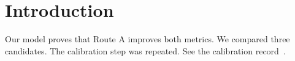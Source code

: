 \documentclass{article}
\begin{document}
\section{Introduction}
Our model proves that Route A improves both metrics.
We compared three candidates.
The calibration step was repeated.
See the calibration record~\cite{demo-log}.
\end{document}

